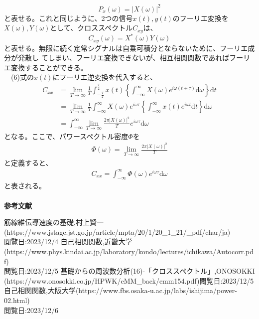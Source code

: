 \documentclass[a4paper,10.5pt]{ltjsarticle}
\begin{document}
\begin{equation}
  P_x(\omega)=|X(\omega)|^2
\end{equation}
と表せる。これと同じように、2つの信号$x(t),y(t)$のフーリエ変換を$X(\omega),Y(\omega)$として、クロススペクトル$C_{xy}$は、
\begin{equation}
  C_{xy}(\omega)=X^*(\omega)Y(\omega)
\end{equation}
と表せる。無限に続く定常シグナルは自乗可積分とならないために、フーリエ成分が発散し
てしまい、フーリエ変換できないが、相互相関関数であればフーリエ変換することができる。\\
　(6)式の$x(t)$にフーリエ逆変換を代入すると、
\begin{align}
  C_{xx}&=\lim_{T\rightarrow\infty}\frac{1}{T}\int_{-\frac{T}{2}}^{\frac{T}{2}}{x(t)\left\{\int_{-\infty}^{\infty}{X(\omega)e^{i\omega(t+\tau)}\mathrm{d}\omega}\right\}\mathrm{d}t}\nonumber\\[10pt]
  &=\lim_{T\rightarrow\infty}\frac{1}{T}\int_{-\infty}^{\infty}{X(\omega)e^{i\omega \tau}\left\{\int_{-\infty}^{\infty}{x(t)e^{i\omega t}\mathrm{d}t}\right\}\mathrm{d}\omega}\nonumber\\[10pt]
  &=\int_{-\infty}^{\infty}{\lim_{T\rightarrow\infty}\frac{2\pi |X(\omega)|^2}{T}e^{i\omega\tau}\mathrm{d}\omega}
\end{align}
となる。ここで、パワースペクトル密度$\Phi$を
\begin{align}
  \Phi(\omega)=\lim_{T\rightarrow\infty}\frac{2\pi|X(\omega)|^2}{T}
\end{align}
と定義すると、
\begin{align}
  C_{xx}=\int_{-\infty}^{\infty}{\Phi(\omega)e^{i\omega\tau}\mathrm{d}\omega}
\end{align}
と表される。
\\
\\
{\Large \bfseries 参考文献}
\begin{thebibliography}{1}
\vspace{-1.5cm}
   筋線維伝導速度の基礎,村上賢一(https://www.jstage.jst.go.jp/article/mpta/20/1/20\_1\_21/\_pdf/\-char/ja)\\閲覧日:2023/12/4
   自己相関関数,近畿大学(https://www.phys.kindai.ac.jp/laboratory/kondo/lectures/ichikawa/Autocorr.pdf)\\閲覧日:2023/12/5
   基礎からの周波数分析(16)-「クロススペクトル」,ONOSOKKI\\(https://www.onosokki.co.jp/HP\-WK/eMM\_back/emm154.pdf)閲覧日:2023/12/5
   自己相関関数,大阪大学(https://www.fbs.osaka-u.ac.jp/labs/ishijima/power-02.html)\\閲覧日:2023/12/6
\end{thebibliography}
\end{document}
